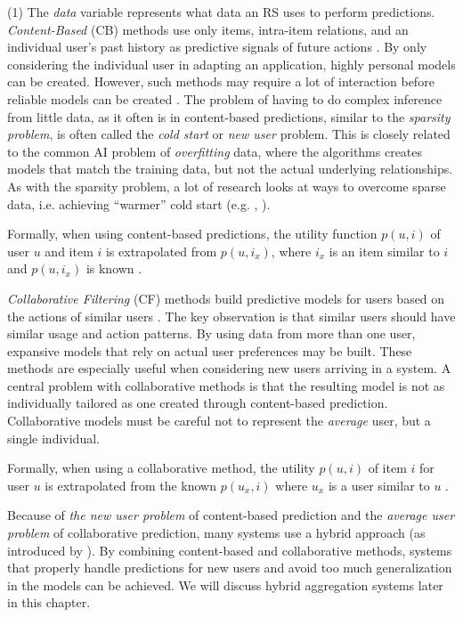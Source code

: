 (1) The \emph{data} variable represents what data an RS uses to perform predictions. 
\emph{Content-Based} (CB) methods use only items, intra-item relations, and 
an individual user's past history as predictive signals of future actions \cite[p.1]{Pazzani2007}.
By only considering the individual user in adapting an application, highly personal models can be created. 
However, such methods may require a lot of interaction before reliable models can be created \cite[p.4]{Adomavicius2005}.
The problem of having to do complex inference from little data, as it often is in content-based predictions,
similar to the \emph{sparsity problem}, is often called the \emph{cold start} or \emph{new user} problem. 
This is closely related to the common AI problem of \emph{overfitting} data, 
where the algorithms creates models that match the training data, 
but not the actual underlying relationships. 
As with the sparsity problem, a lot of research looks at ways to overcome sparse data, i.e. achieving ``warmer'' cold start
(e.g. \cite{Said2009}, \cite{Lilegraven2011}). 

Formally, when using content-based predictions, the utility function $p(u,i)$ of user $u$ and item $i$ is extrapolated from $p(u,i_x)$, 
where $i_x$ is an item similar to $i$ and $p(u,i_x)$ is known \cite[p.2]{Adomavicius2005}.

\emph{Collaborative Filtering} (CF) methods build predictive models for users based on the actions of similar users \citep{Schafer2007}.
The key observation is that similar users should have similar usage and action patterns. 
By using data from more than one user, expansive models that rely on actual user preferences may be built. 
These methods are especially useful when considering new users arriving in a system. 
A central problem with collaborative methods is that the resulting model is not as individually tailored as one created through content-based prediction. 
Collaborative models must be careful not to represent the \emph{average} user, but a single individual.

Formally, when using a collaborative method, 
the utility $p(u,i)$ of item $i$ for user $u$ is extrapolated from the known $p(u_x,i)$ where $u_x$ is a user similar to $u$
\cite[p.4]{Adomavicius2005}. 

Because of \emph{the new user problem} of content-based prediction and the \emph{average user problem} of collaborative prediction, 
many systems use a hybrid approach (as introduced by \cite{Burke2007}).
By combining content-based and collaborative methods, 
systems that properly handle predictions for new users and avoid too much generalization in the models can be achieved. 
We will discuss hybrid aggregation systems later in this chapter.

